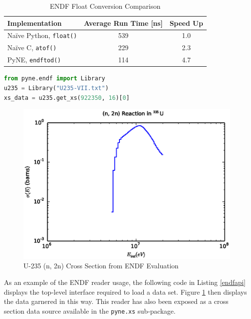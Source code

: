 \documentclass{ansconf}
\begin{document}
\begin{table}
\caption{ENDF Float Conversion Comparison}
\label{endftod}
\begin{center}
\begin{tabular}[htbp]{|l|c|c|}
\hline
\textbf{Implementation} & \textbf{Average Run Time [ns]} & \textbf{Speed Up} \\
\hline
Na\"{i}ve Python, \texttt{float()} & 539 & 1.0 \\
\hline
Na\"{i}ve C, \texttt{atof()} & 229 & 2.3 \\
\hline
PyNE, \texttt{endftod()} & 114 & 4.7 \\
\hline
\end{tabular}
\end{center}
\end{table}

\begin{lstlisting}[language=Python,basicstyle=\scriptsize,frame=single,caption=ENDF Reader API,label=endfapi]
from pyne.endf import Library
u235 = Library("U235-VII.txt")
xs_data = u235.get_xs(922350, 16)[0]
\end{lstlisting}

\begin{figure}[htbp]
\begin{center}
\includegraphics[scale=1.0]{u235_2n.eps}
\end{center}
\caption{U-235 (n, 2n) Cross Section from ENDF Evaluation}
\label{u235}
\end{figure}

As an example of the ENDF reader usage, the following code in Listing \ref{endfapi} 
displays the top-level interface required to load a data set.  Figure \ref{u235} 
then displays the data garnered in this way.  This reader has also
been exposed as a cross section data source available in the \texttt{pyne.xs} 
sub-package.
\end{document}
